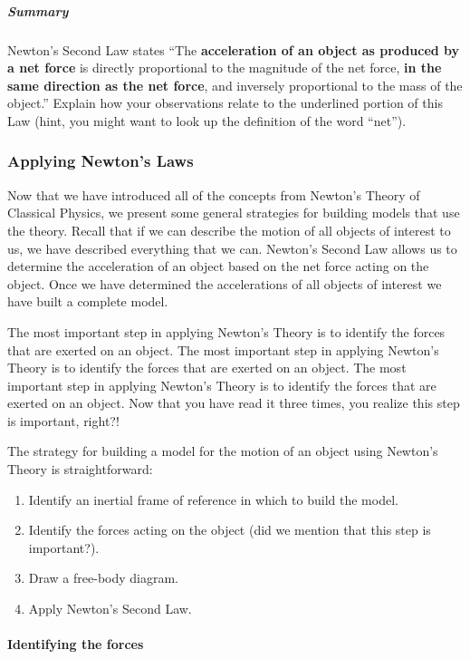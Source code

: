 \subparagraph{Summary}

Newton's Second Law states ``The \textbf{acceleration of an object as produced by a net force} is directly proportional to the magnitude of the net force, \textbf{in the same direction as the net force}, and inversely proportional to the mass of the object.'' Explain how your observations relate to the underlined portion of this Law (hint, you might want to look up the definition of the word ``net'').

\subsubsection{Applying Newton's Laws}

Now that we have introduced all of the concepts from Newton's Theory of Classical Physics, we present some general strategies for building models that use the theory. Recall that if we can describe the motion of all objects of interest to us, we have described everything that we can. Newton's Second Law allows us to determine the acceleration of an object based on the net force acting on the object. Once we have determined the accelerations of all objects of interest we have built a complete model.

The most important step in applying Newton's Theory is to identify the forces that are exerted on an object. The most important step in applying Newton's Theory is to identify the forces that are exerted on an object. The most important step in applying Newton's Theory is to identify the forces that are exerted on an object. Now that you have read it three times, you realize this step is important, right?!

The strategy for building a model for the motion of an object using Newton's Theory is straightforward:

\begin{enumerate}
\item Identify an inertial frame of reference in which to build the model.
\item Identify the forces acting on the object (did we mention that this step is important?).
\item Draw a free-body diagram.
\item Apply Newton's Second Law.
\end{enumerate}

\paragraph{Identifying the forces}

